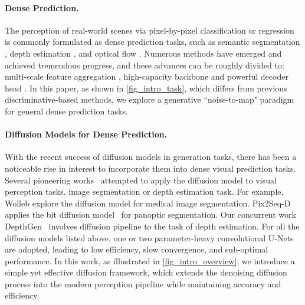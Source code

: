 \documentclass[10pt,twocolumn,letterpaper]{article}
\begin{document}
\paragraph{Dense Prediction.}
The perception of real-world scenes via pixel-by-pixel classification or regression is commonly formulated as dense prediction tasks, such as semantic segmentation \cite{Cordts_2016_CVPR,zhou2017scene}, depth estimation \cite{geiger2013vision,silberman2012indoor,song2015sun}, and optical flow \cite{fischer2015flownet,geiger2013vision}.
Numerous methods have emerged and achieved tremendous progress, and these advances can be roughly divided to:
multi-scale feature aggregation \cite{chen2017deeplab, chen2018encoder,xiao2018unified}, high-capacity backbone \cite{xie2021segformer,zheng2021rethinking,ranftl2021vision} and powerful decoder head \cite{strudel2021segmenter,zhang2021k,cheng2021per,jain2022oneformer}.
In this paper, as shown in \cref{fig_intro_task}, which differs from previous discriminative-based methods, we explore a generative ``noise-to-map" paradigm for general dense prediction tasks.

\paragraph{Diffusion Models for Dense Prediction.}
With the recent success of diffusion models in generation tasks, there has been a noticeable rise in interest to incorporate them into dense visual prediction tasks.
Several pioneering works~\cite{wu2022medsegdiff,amit2021segdiff,wolleb2022diffusion,chen2022generalist,saxena2023depthgen,chen2022diffusiondet} attempted to apply the diffusion model to visual perception tasks, \eg image segmentation or depth estimation task. For example, Wolleb \etal \cite{wolleb2022diffusion} explore the diffusion model for medical image segmentation. Pix2Seq-D~\cite{chen2022generalist} applies the bit diffusion model~\cite{chen2023analog} for panoptic segmentation. Our concurrent work DepthGen~\cite{saxena2023depthgen} involves diffusion pipeline to the task of depth estimation.
For all the diffusion models listed above, one or two parameter-heavy convolutional U-Nets~\cite{ronneberger2015u} are adopted, leading to low efficiency, slow convergence, and sub-optimal performance.
In this work, as illustrated in \cref{fig_intro_overview}, we introduce a simple yet effective diffusion framework, which extends the denoising diffusion process into the modern perception pipeline while maintaining accuracy and efficiency.
\end{document}
